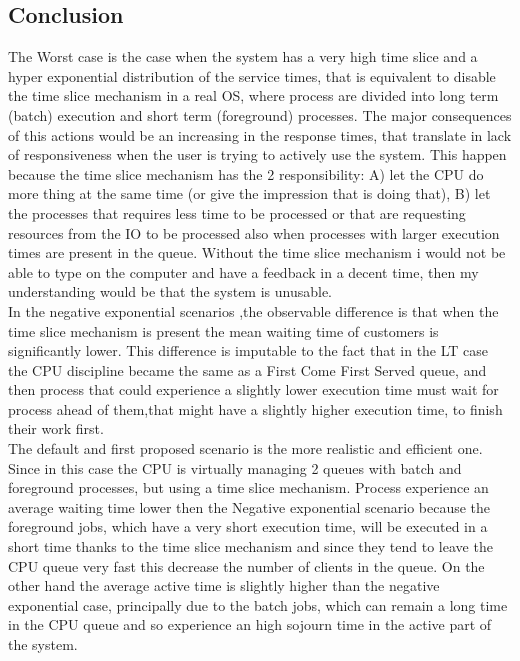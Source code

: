 \documentclass[12pt,a4paper]{article}
\begin{document}
\subsection{Conclusion}
The Worst case is the case when the system has a very high time slice and a hyper exponential distribution of the service times, that is equivalent to disable the time slice mechanism in a real OS, where process are divided into long term (batch) execution and short term (foreground) processes. The major consequences of this actions would be an increasing in the response times, that translate in lack of responsiveness when the user is trying to actively use the system. This happen because the time slice mechanism has the 2 responsibility: A) let the CPU do more thing at the same time (or give the impression that is doing that), B) let the processes that requires less time to be processed or that are requesting resources from the IO to be processed also when processes with larger execution times are present in the queue. Without the time slice mechanism i would not be able to type on the computer and have a feedback in a decent time, then my understanding would be that the system is unusable. 
\\
In the negative exponential scenarios ,the observable difference is that when the time slice mechanism is present the mean waiting time of customers is significantly lower. This difference is imputable to the fact that in the LT case the CPU discipline became the same as a First Come First Served queue, and then process that could experience a slightly lower execution time must wait for process ahead of them,that might have a slightly higher execution time, to finish their work first.
\\
The default and first proposed scenario is the more realistic and efficient one. Since in this case the CPU is virtually managing 2 queues with batch and foreground processes, but using a time slice mechanism. Process experience an average waiting time lower then the Negative exponential scenario because the foreground jobs, which have a very short execution time, will be executed in a short time thanks to the time slice mechanism and since they tend to leave the CPU queue very fast this decrease the number of clients in the queue. On the other hand the average active time is slightly higher than the negative exponential case, principally due to the batch jobs, which can remain a long time in the CPU queue and so experience an high sojourn time in the active part of the system.  
\end{document}
